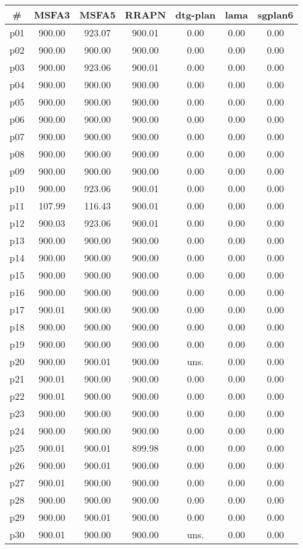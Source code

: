 \begin{tabular}{ccccccc}
\toprule
\textbf{\#} & \textbf{MSFA3} & \textbf{MSFA5} & \textbf{RRAPN} & \textbf{dtg-plan} & \textbf{lama} & \textbf{sgplan6}\\
\midrule
p01 & 900.00 & 923.07 & 900.01 & 0.00 & 0.00 & 0.00\\
p02 & 900.00 & 900.00 & 900.00 & 0.00 & 0.00 & 0.00\\
p03 & 900.00 & 923.06 & 900.01 & 0.00 & 0.00 & 0.00\\
p04 & 900.00 & 900.00 & 900.00 & 0.00 & 0.00 & 0.00\\
p05 & 900.00 & 900.00 & 900.00 & 0.00 & 0.00 & 0.00\\
p06 & 900.00 & 900.00 & 900.00 & 0.00 & 0.00 & 0.00\\
p07 & 900.00 & 900.00 & 900.00 & 0.00 & 0.00 & 0.00\\
p08 & 900.00 & 900.00 & 900.00 & 0.00 & 0.00 & 0.00\\
p09 & 900.00 & 900.00 & 900.00 & 0.00 & 0.00 & 0.00\\
p10 & 900.00 & 923.06 & 900.01 & 0.00 & 0.00 & 0.00\\
p11 & 107.99 & 116.43 & 900.01 & 0.00 & 0.00 & 0.00\\
p12 & 900.03 & 923.06 & 900.01 & 0.00 & 0.00 & 0.00\\
p13 & 900.00 & 900.00 & 900.00 & 0.00 & 0.00 & 0.00\\
p14 & 900.00 & 900.00 & 900.00 & 0.00 & 0.00 & 0.00\\
p15 & 900.00 & 900.00 & 900.00 & 0.00 & 0.00 & 0.00\\
p16 & 900.00 & 900.00 & 900.00 & 0.00 & 0.00 & 0.00\\
p17 & 900.01 & 900.00 & 900.00 & 0.00 & 0.00 & 0.00\\
p18 & 900.00 & 900.00 & 900.00 & 0.00 & 0.00 & 0.00\\
p19 & 900.00 & 900.00 & 900.00 & 0.00 & 0.00 & 0.00\\
p20 & 900.00 & 900.01 & 900.00 & uns. & 0.00 & 0.00\\
p21 & 900.01 & 900.00 & 900.00 & 0.00 & 0.00 & 0.00\\
p22 & 900.01 & 900.00 & 900.00 & 0.00 & 0.00 & 0.00\\
p23 & 900.00 & 900.00 & 900.00 & 0.00 & 0.00 & 0.00\\
p24 & 900.00 & 900.00 & 900.00 & 0.00 & 0.00 & 0.00\\
p25 & 900.01 & 900.01 & 899.98 & 0.00 & 0.00 & 0.00\\
p26 & 900.00 & 900.01 & 900.00 & 0.00 & 0.00 & 0.00\\
p27 & 900.01 & 900.00 & 900.00 & 0.00 & 0.00 & 0.00\\
p28 & 900.00 & 900.00 & 900.00 & 0.00 & 0.00 & 0.00\\
p29 & 900.00 & 900.01 & 900.00 & 0.00 & 0.00 & 0.00\\
p30 & 900.01 & 900.00 & 900.00 & uns. & 0.00 & 0.00\\
\bottomrule
\end{tabular}

